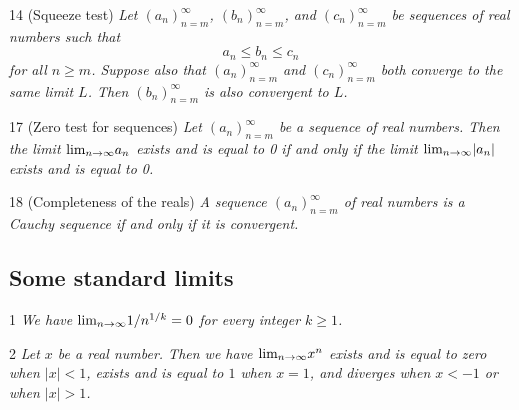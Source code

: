 \begin{corollary}{14}
    \label{squeeze-test}
    (Squeeze test) \emph{Let $(a_n)_{n=m}^{\infty}$, $(b_n)_{n=m}^{\infty}$, and
    $(c_n)_{n=m}^{\infty}$ be sequences of real numbers such that
    \begin{equation*}
        a_n \leq b_n \leq c_n
    \end{equation*}
    for all $n \geq m$. Suppose also that $(a_n)_{n=m}^{\infty}$ and $(c_n)_{n=m}^{\infty}$
    both converge to the same limit $L$. Then $(b_n)_{n=m}^{\infty}$ is also convergent
    to $L$.}
\end{corollary}

\begin{corollary}{17}
    \label{zero-test-sequences}
    (Zero test for sequences) \emph{Let $(a_n)_{n=m}^{\infty}$ be a sequence of real
    numbers. Then the limit $\text{lim}_{n \rightarrow \infty}{a_n}$ exists and is equal to 0 if and only if
    the limit $\text{lim}_{n \rightarrow \infty}{|a_n|}$ exists and is equal to 0.}
\end{corollary}

\begin{theorem}{18}
    \label{reals-complete}
    (Completeness of the reals) \emph{A sequence $(a_n)_{n=m}^{\infty}$ of real numbers
    is a Cauchy sequence if and only if it is convergent.}
\end{theorem}

\subsection{Some standard limits}
\begin{corollary}{1}
    \label{lim-root-decay}
    \emph{We have $\text{lim}_{n \rightarrow \infty}{1/n^{1/k}} = 0$ for every integer $k \geq 1$.}
\end{corollary}

\begin{lemma}{2}
    \label{lim-x-pow-n}
    \emph{Let $x$ be a real number. Then we have $\text{lim}_{n \rightarrow \infty}{x^n}$ exists and is equal
    to zero when $|x| < 1$, exists and is equal to $1$ when $x = 1$, and diverges
    when $x < -1$ or when $|x| > 1$.}
\end{lemma}

